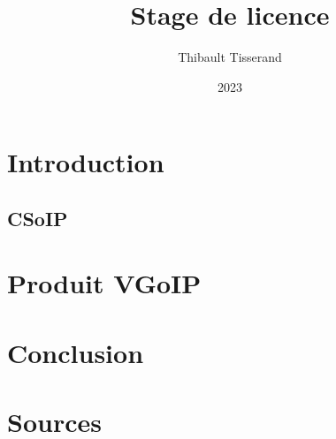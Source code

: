 \documentclass{beamer}
\title{Stage de licence}
\author{Thibault Tisserand}
\institute{Université de Lille}
\date{2023}
\begin{document}
\titlepage



\section{Introduction}


\subsection{CSoIP}


\section{Produit VGoIP}


\section{Conclusion}


\section{Sources}

\end{document}
